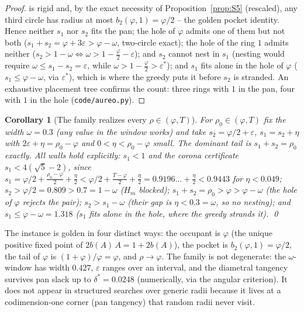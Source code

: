 \documentclass[11pt]{article}
\newtheorem{corollary}[theorem]{Corollary}
\theoremstyle{definition}
\begin{document}
\begin{proof}
is rigid and, by the exact necessity of Proposition~\ref{prop:S5}
(rescaled), any third circle has radius at most
$b_2(\varphi,1)=\varphi/2$ -- the golden pocket identity. Hence neither
$s_1$ nor $s_2$ fits the pan; the hole of $\varphi$ admits one of them
but not both ($s_1+s_2=\varphi+3\varepsilon>\varphi-\omega$, two-circle
exact); the hole of the ring $1$ admits neither
($s_2>1-\omega\iff\omega>1-\tfrac\varphi2-\varepsilon$); and
$s_2$ cannot nest in $s_1$ (nesting would require
$\omega\le s_1-s_2=\varepsilon$, while
$\omega>1-\tfrac\varphi2>\varepsilon^\ast$); and $s_1$ fits alone in the hole of
$\varphi$ ($s_1\le\varphi-\omega$, via $\varepsilon^\ast$), which is
where the greedy puts it before $s_2$ is stranded. An exhaustive
placement tree confirms the count: three rings with $1$ in the pan,
four with $1$ in the hole (\texttt{code/aureo.py}).
\end{proof}

\begin{corollary}[The family realizes every $\rho\in(\varphi,T)$]
\label{cor:goldencover}
For $\rho_0\in(\varphi,T)$ fix the width $\omega=0.3$ (any value in
the window works) and take $s_2=\varphi/2+\varepsilon$, $s_1=s_2+\eta$
with $2\varepsilon+\eta=\rho_0-\varphi$ and $0<\eta<\rho_0-\varphi$
small. The dominant tail is $s_1+s_2=\rho_0$ exactly. All walls hold
explicitly: $s_1<1$ and the corona certificate $s_1<4(\sqrt5-2)$, since
$s_1=\varphi/2+\tfrac{\rho_0-\varphi}{2}+\tfrac\eta2
<\varphi/2+\tfrac{T-\varphi}{2}+\tfrac\eta2=0.9196\ldots+\tfrac\eta2
<0.9443$ for $\eta<0.049$; $s_2>\varphi/2=0.809>0.7=1-\omega$ ($H_m$
blocked); $s_1+s_2=\rho_0>\varphi>\varphi-\omega$ (the hole of
$\varphi$ rejects the pair); $s_2>s_1-\omega$ (their gap is
$\eta<0.3=\omega$, so no nesting); and $s_1\le\varphi-\omega=1.318$
($s_1$ fits alone in the hole, where the greedy strands it). \qed
\end{corollary}

The instance is golden in four distinct ways: the occupant is
$\varphi$ (the unique positive fixed point of $2b(A)\,A=1+2b(A)$), the
pocket is $b_2(\varphi,1)=\varphi/2$, the tail of $\varphi$ is
$(1+\varphi)/\varphi=\varphi$, and $\rho\to\varphi$. The family is not
degenerate: the $\omega$-window has width $0.427$, $\varepsilon$ ranges
over an interval, and the diametral tangency survives pan slack up to
$\delta^\ast=0.0248$ (numerically, via the angular criterion). It
does not appear in structured searches over generic radii because it lives at a
codimension-one corner (pan tangency) that random radii never visit.
\end{document}
